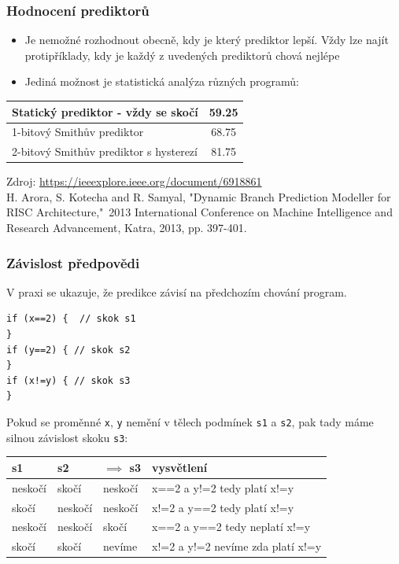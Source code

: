 \documentclass{beamer}
\begin{document}
\begin{frame}
\frametitle{Hodnocení prediktorů}

\begin{itemize}
\item Je nemožné rozhodnout obecně, kdy je který prediktor lepší. Vždy lze najít protipříklady, kdy je každý z uvedených prediktorů chová nejlépe
\item Jediná možnost je statistická analýza různých programů:
\end{itemize}
\begin{center}
\begin{tabular}{|l|c|} \hline
Statický prediktor - vždy se skočí & 59.25 \\\hline
1-bitový Smithův prediktor         & 68.75 \\\hline
2-bitový Smithův prediktor s hysterezí & 81.75 \\\hline
\end{tabular}
\end{center}

Zdroj: \url{https://ieeexplore.ieee.org/document/6918861}\\
H. Arora, S. Kotecha and R. Samyal, "Dynamic Branch Prediction Modeller for RISC Architecture," 2013 International Conference on Machine Intelligence and Research Advancement, Katra, 2013, pp. 397-401.
\end{frame}

\begin{frame}[fragile]
\frametitle{Závislost předpovědi}

V praxi se ukazuje, že predikce závisí na předchozím chování program.

\begin{verbatim}
if (x==2) {  // skok s1
}
if (y==2) { // skok s2
}
if (x!=y) { // skok s3
}
\end{verbatim}

Pokud se proměnné \texttt{x}, \texttt{y} nemění v tělech podmínek \texttt{s1} a \texttt{s2}, pak tady máme silnou závislost skoku \texttt{s3}:

\bigskip

\begin{tabular}{|l|l|l|l|}\hline
s1 & s2 & $\implies$ s3 & vysvětlení \\\hline
neskočí & skočí   & neskočí & x==2 a y!=2 tedy platí x!=y \\\hline
skočí   & neskočí & neskočí & x!=2 a y==2 tedy platí x!=y \\\hline
neskočí & neskočí & skočí   & x==2 a y==2 tedy neplatí x!=y\\\hline 
skočí   & skočí   & nevíme  & x!=2 a y!=2 nevíme zda platí x!=y \\\hline
\end{tabular}
\end{frame}
\end{document}
